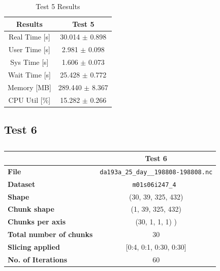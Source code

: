 \documentclass{article}
\begin{document}
\begin{table}[h!]
    \centering
    \begin{tabular}{cc}
        \hline
        \textbf{Results} & Test 5              \\ \hline
        Real Time [s]    & 30.014 $\pm$ 0.898  \\
        User Time [s]    & 2.981 $\pm$ 0.098   \\
        Sys Time [s]     & 1.606 $\pm$ 0.073   \\
        Wait Time [s]    & 25.428 $\pm$ 0.772  \\
        Memory [MB]      & 289.440 $\pm$ 8.367 \\
        CPU Util [\%]    & 15.282 $\pm$ 0.266  \\
        \hline
    \end{tabular}
    \caption{Test 5 Results}
    \label{tab:T5_Results}
\end{table}

\subsection{Test 6}

\begin{table}[h!] 
    \centering 
    \begin{tabular}{lc}  \hline
                                        & Test 6                                         \\ \hline
        \textbf{File}                   & \texttt{da193a\_25\_day\_\_198808-198808.nc}   \\  
        \textbf{Dataset}                &\texttt{m01s06i247\_4 }                         \\ 
        \textbf{Shape}                  & (30, 39, 325, 432)                             \\ 
        \textbf{Chunk shape}            & (1, 39, 325, 432)                              \\ 
        \textbf{Chunks per axis}        &  (30, 1, 1, 1) )                               \\ 
        \textbf{Total number of chunks} & 30                                             \\ 
        \textbf{Slicing applied}        & [0:4, 0:1, 0:30, 0:30]                         \\ 
        \textbf{No. of Iterations}      & 60                                             \\  \hline
    \end{tabular}
    \caption{} 
    \label{tab:T6_Conditions} 
\end{table}
\end{document}
